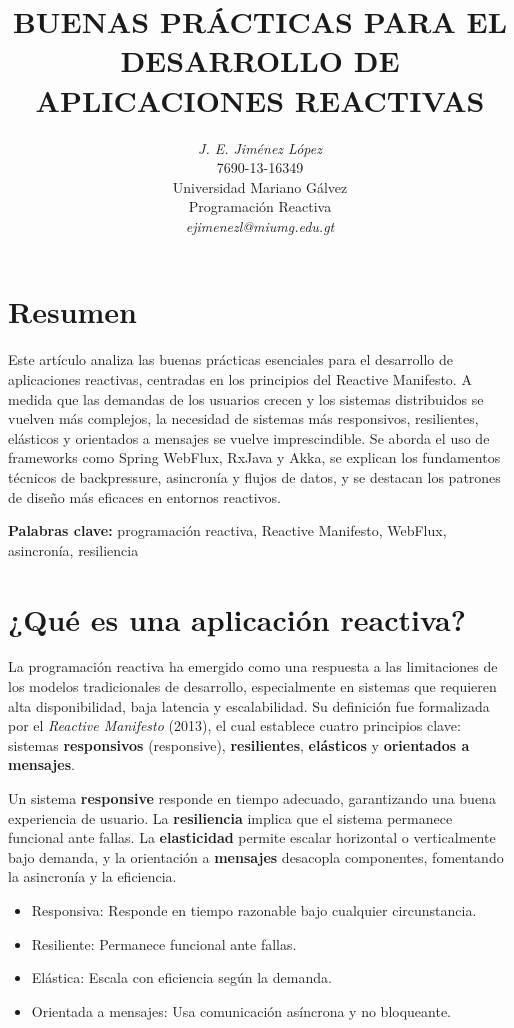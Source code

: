\documentclass[12pt]{article}
\title{\textbf{BUENAS PRÁCTICAS PARA EL DESARROLLO DE APLICACIONES REACTIVAS}}
\author{\textit{J. E. Jiménez López} \\ 7690-13-16349 \\ Universidad Mariano Gálvez \\ Programación Reactiva \\ \textit{ejimenezl@miumg.edu.gt}}
\date{}
\begin{document}
\maketitle

\section*{Resumen}
Este artículo analiza las buenas prácticas esenciales para el desarrollo de aplicaciones reactivas, centradas en los principios del Reactive Manifesto. A medida que las demandas de los usuarios crecen y los sistemas distribuidos se vuelven más complejos, la necesidad de sistemas más responsivos, resilientes, elásticos y orientados a mensajes se vuelve imprescindible. Se aborda el uso de frameworks como Spring WebFlux, RxJava y Akka, se explican los fundamentos técnicos de backpressure, asincronía y flujos de datos, y se destacan los patrones de diseño más eficaces en entornos reactivos.

\noindent \textbf{Palabras clave:} programación reactiva, Reactive Manifesto, WebFlux, asincronía, resiliencia

\section*{¿Qué es una aplicación reactiva?}
La programación reactiva ha emergido como una respuesta a las limitaciones de los modelos tradicionales de desarrollo, especialmente en sistemas que requieren alta disponibilidad, baja latencia y escalabilidad. Su definición fue formalizada por el \textit{Reactive Manifesto} (2013), el cual establece cuatro principios clave: sistemas \textbf{responsivos} (responsive), \textbf{resilientes}, \textbf{elásticos} y \textbf{orientados a mensajes}.


Un sistema \textbf{responsive} responde en tiempo adecuado, garantizando una buena experiencia de usuario. La \textbf{resiliencia} implica que el sistema permanece funcional ante fallas. La \textbf{elasticidad} permite escalar horizontal o verticalmente bajo demanda, y la orientación a \textbf{mensajes} desacopla componentes, fomentando la asincronía y la eficiencia.

\begin{itemize}
    \item Responsiva: Responde en tiempo razonable bajo cualquier circunstancia.
\end{itemize}
\begin{itemize}
    \item Resiliente: Permanece funcional ante fallas.
\end{itemize}
\begin{itemize}
    \item Elástica: Escala con eficiencia según la demanda.
\end{itemize}
\begin{itemize}
    \item Orientada a mensajes: Usa comunicación asíncrona y no bloqueante.
\end{itemize}
\end{document}
